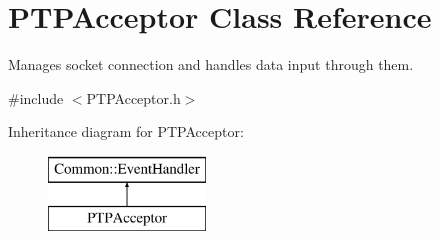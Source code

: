 \hypertarget{class_p_t_p_acceptor}{\section{P\-T\-P\-Acceptor Class Reference}
\label{class_p_t_p_acceptor}
}


Manages socket connection and handles data input through them.  




{\ttfamily \#include $<$P\-T\-P\-Acceptor.\-h$>$}

Inheritance diagram for P\-T\-P\-Acceptor\-:\begin{figure}[H]
\begin{center}
\leavevmode
\includegraphics[height=2.000000cm]{class_p_t_p_acceptor}
\end{center}
\end{figure}
